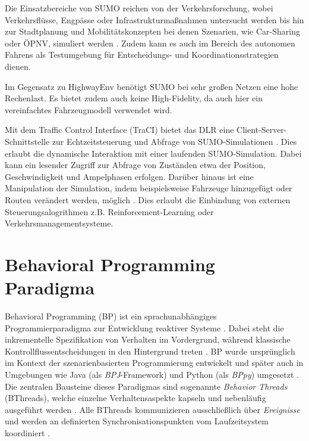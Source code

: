 Die Einsatzbereiche von SUMO reichen von der Verkehrsforschung, wobei Verkehrsflüsse, Engpässe oder Infrastrukturmaßnahmen untersucht werden bis hin zur Stadtplanung und Mobilitätskonzepten bei denen Szenarien, wie Car-Sharing oder ÖPNV, simuliert werden \cite{SUMO2018}. Zudem kann es auch im Bereich des autonomen Fahrens als Testumgebung für Entscheidungs- und Koordinationsstrategien dienen.

Im Gegensatz zu HighwayEnv benötigt SUMO bei sehr großen Netzen eine hohe Rechenlast. Es bietet zudem auch keine High-Fidelity, da auch hier ein vereinfachtes Fahrzeugmodell verwendet wird.

Mit dem Traffic Control Interface (TraCI) bietet das DLR eine Client-Server-Schnittstelle zur Echtzeitsteuerung und Abfrage von SUMO-Simulationen \cite{sumo_traci}. Dies erlaubt die dynamische Interaktion mit einer laufenden SUMO-Simulation. Dabei kann ein lesender Zugriff zur Abfrage von Zuständen etwa der Position, Geschwindigkeit und Ampelphasen erfolgen. Darüber hinaus ist eine Manipulation der Simulation, indem beispielsweise Fahrzeuge hinzugefügt oder Routen verändert werden, möglich \cite{sumo_traci}. Dies erlaubt die Einbindung von externen Steuerungsalogrithmen z.B. Reinforcement-Learning oder Verkehrsmanagementsysteme.

\section{Behavioral Programming Paradigma}\label{sec:behavioral-programming}
Behavioral Programming (BP) ist ein sprachunabhängiges Programmierparadigma zur Entwicklung reaktiver Systeme \cite{Harel2012}.
Dabei steht die inkrementelle Spezifikation von Verhalten im Vordergrund, während klassische Kontrollflussentscheidungen in den Hintergrund treten \cite{Harel2012}.
BP wurde ursprünglich im Kontext der szenarienbasierten Programmierung entwickelt und später auch in Umgebungen wie Java (als \emph{BPJ}-Framework) und Python (als \emph{BPpy}) umgesetzt \cite{Harel2010}.
Die zentralen Bausteine dieses Paradigmas sind sogenannte \emph{Behavior Threads} (BThreads), welche einzelne Verhaltensaspekte kapseln und nebenläufig ausgeführt werden \cite{Harel2010}.
Alle BThreads kommunizieren ausschließlich über \emph{Ereignisse} und werden an definierten Synchronisationspunkten vom Laufzeitsystem koordiniert \cite{Harel2012}.

